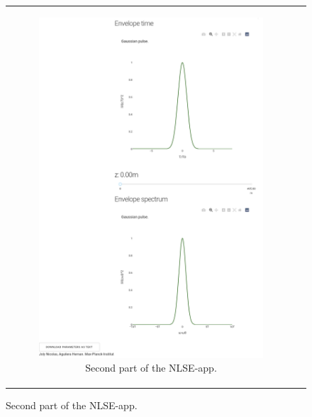 \begin{figure}[label={fig:herokunlse}, caption={NLSE-App accesed via Google Chrome in an Android device.}]
\begin{tabular}[c]{cc}
{\begin{subfigure}[b]{.48\textwidth}
            \includegraphics[width=1\textwidth]{figures/chap4/android_nlse2.png}
            \caption{Second part of the NLSE-app.}
            \label{fig:herokunlse2}
        \end{subfigure}}
        \end{tabular}
        \end{figure}
